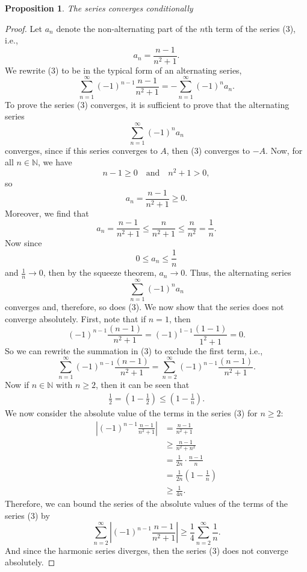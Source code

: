 \documentclass[12pt]{article}
\newtheorem{proposition}{Proposition}
\newcommand{\isp}[1]{\quad\text{#1}\quad}
\newcommand{\N}{\mathbb{N}} %
\newcommand{\<}{\left\langle} %
\renewcommand{\>}{\right\rangle} %
\begin{document}
\begin{proposition}
    The series converges conditionally
\end{proposition}

\begin{proof}
    Let $a_n$ denote the non-alternating part of the $n$th term of the series (3), i.e.,
    \[
        a_n = \frac{n - 1}{n^2 + 1}.
    \]
    We rewrite (3) to be in the typical form of an alternating series,
    \[
        \sum_{n=1}^\infty (-1)^{n - 1}\frac{n-1}{n^2 + 1} = -\sum_{n=1}^\infty (-1)^n a_n.
    \]
    To prove the series (3) converges, it is sufficient to prove that the alternating series
    \[
        \sum_{n=1}^\infty (-1)^n a_n
    \]
    converges, since if this series converges to $A$, then (3) converges to $-A$. Now, for all $n \in \N$, we have
    \[
        n - 1 \geq 0 \isp{and} n^2 + 1 > 0,
    \]
    so
    \[
        a_n = \frac{n - 1}{n^2 + 1} \geq 0.
    \]
    Moreover, we find that
    \[
        a_n = \frac{n - 1}{n^2 + 1} \leq \frac{n}{n^2 + 1} \leq \frac{n}{n^2} = \frac1n. 
    \]
    Now since
    \[
        0 \leq a_n \leq \frac1n
    \]
    and $\frac1n \to 0$, then by the squeeze theorem, $a_n \to 0$. Thus, the alternating series
    \[
        \sum_{n=1}^\infty (-1)^n a_n
    \]
    converges and, therefore, so does (3). We now show that the series does not converge absolutely. First, note that if $n = 1$, then
    \[
        (-1)^{n-1}\frac{(n-1)}{n^2+1} = (-1)^{1-1}\frac{(1-1)}{1^2+1} = 0.
    \]
    So we can rewrite the summation in (3) to exclude the first term, i.e.,
    \[
        \sum_{n=1}^\infty (-1)^{n - 1}\frac{(n-1)}{n^2+1} = \sum_{n=2}^\infty (-1)^{n-1}\frac{(n-1)}{n^2+1}.
    \]
    Now if $n \in \N$ with $n \geq 2$, then it can be seen that
    \begin{align*}
        \frac12 = \left( 1 - \frac12 \right) \leq \left( 1 - \frac1n \right).
    \end{align*}
    We now consider the absolute value of the terms in the series (3) for $n \geq 2$:
    \begin{align*}
        \left| (-1)^{n - 1}\frac{n - 1}{n^2 + 1} \right|
            &= \frac{n - 1}{n^2 + 1} \\
            &\geq \frac{n - 1}{n^2 + n^2} \\
            &= \frac{1}{2n} \cdot \frac{n - 1}{n} \\
            &= \frac{1}{2n} \left( 1 - \frac1n \right) \\
            &\geq \frac{1}{4n}.
    \end{align*}
    Therefore, we can bound the series of the absolute values of the terms of the series (3) by
    \[
        \sum_{n = 2}^\infty \left| (-1)^{n - 1}\frac{n - 1}{n^2 + 1} \right| \geq \frac14 \sum_{n = 2}^\infty \frac1n.
    \]
    And since the harmonic series diverges, then the series (3) does not converge absolutely.
    
\end{proof}
\end{document}

